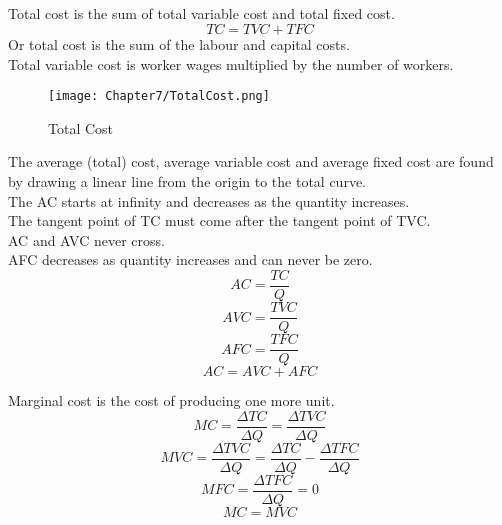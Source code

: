 \subsection{}
Total cost is the sum of total variable cost and total fixed cost.
\begin{equation}
    TC = TVC + TFC
\end{equation}
Or total cost is the sum of the labour and capital costs.\\
Total variable cost is worker wages multiplied by the number of workers.
\begin{figure}[H]
    \centering
    \texttt{[image: Chapter7/TotalCost.png]}
    \caption{Total Cost}
\end{figure}
\par
The average (total) cost, average variable cost and average fixed cost are found by drawing a linear line from the origin to the total curve.\\
The AC starts at infinity and decreases as the quantity increases.\\
The tangent point of TC must come after the tangent point of TVC.\\
AC and AVC never cross.\\
AFC decreases as quantity increases and can never be zero.
\begin{equation}
    AC = \frac{TC}{Q}
\end{equation}
\begin{equation}
    AVC = \frac{TVC}{Q}
\end{equation}
\begin{equation}
    AFC = \frac{TFC}{Q}
\end{equation}
\begin{equation}
    AC = AVC + AFC
\end{equation}
\par
Marginal cost is the cost of producing one more unit.
\begin{equation}
    MC = \frac{\Delta TC}{\Delta Q} = \frac{\Delta TVC}{\Delta Q}
\end{equation}
\begin{equation}
    MVC = \frac{\Delta TVC}{\Delta Q} = \frac{\Delta TC}{\Delta Q} - \frac{\Delta TFC}{\Delta Q}
\end{equation}
\begin{equation}
    MFC = \frac{\Delta TFC}{\Delta Q} = 0
\end{equation}
\begin{equation}
    MC = MVC
\end{equation}
